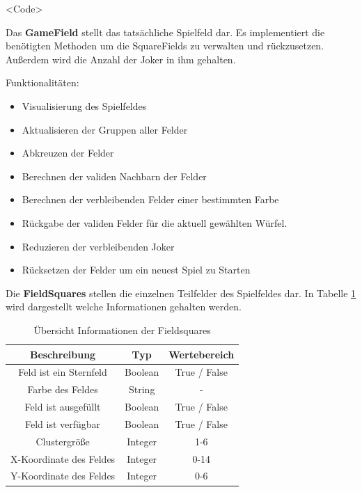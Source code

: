 <Code>

Das \textbf{GameField} stellt das tatsächliche Spielfeld dar.
Es implementiert die benötigten Methoden um die SquareFields zu verwalten und rückzusetzen.
Außerdem wird die Anzahl der Joker in ihm gehalten.

Funktionalitäten:
\begin{itemize}
	\item  Visualisierung des Spielfeldes
    \item  Aktualisieren der Gruppen aller Felder
    \item  Abkreuzen der Felder
    \item  Berechnen der validen Nachbarn der Felder
    \item  Berechnen der verbleibenden Felder einer bestimmten Farbe
    \item  Rückgabe der validen Felder für die aktuell gewählten Würfel.
    \item  Reduzieren der verbleibenden Joker
    \item  Rücksetzen der Felder um ein neuest Spiel zu Starten
\end{itemize}

Die \textbf{FieldSquares} stellen die einzelnen Teilfelder des Spielfeldes dar. In Tabelle \ref{tab:Informationen in FieldSquares} wird dargestellt welche Informationen gehalten werden.
\begin{table}[htbp]
    \centering
    \begin{tabular}{|c|c|c|}
    \hline
    \textbf{Beschreibung} & \textbf{Typ} & \textbf{Wertebereich} \\
    \hline
    Feld ist ein Sternfeld & Boolean & True / False \\
    \hline
    Farbe des Feldes & String & - \\
    \hline
    Feld ist ausgefüllt & Boolean & True / False \\
    \hline
    Feld ist verfügbar & Boolean & True / False \\
    \hline
    Clustergröße & Integer & 1-6 \\
    \hline
    X-Koordinate des Feldes & Integer & 0-14 \\
    \hline
    Y-Koordinate des Feldes & Integer & 0-6 \\
    \hline
    \end{tabular}
    \caption{Übersicht Informationen der Fieldsquares}
    \label{tab:Informationen in FieldSquares}
\end{table}

